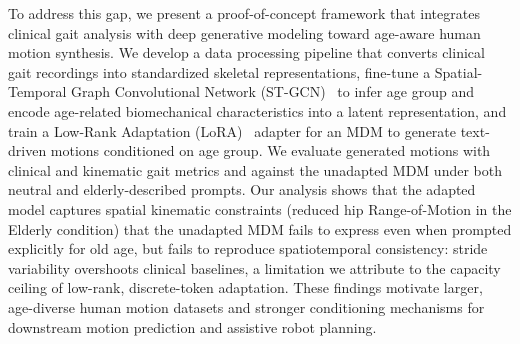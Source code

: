 To address this gap, we present a proof-of-concept framework that integrates clinical gait analysis with deep generative modeling toward age-aware human motion synthesis.
We develop a data processing pipeline that converts clinical gait recordings into standardized skeletal representations, fine-tune a Spatial-Temporal Graph Convolutional Network (ST-GCN)~\cite{yan2018stgcn} to infer age group and encode age-related biomechanical characteristics into a latent representation, and train a Low-Rank Adaptation (LoRA)~\cite{hu2022lora} adapter for an MDM to generate text-driven motions conditioned on age group.
We evaluate generated motions with clinical and kinematic gait metrics and against the unadapted MDM under both neutral and elderly-described prompts.
Our analysis shows that the adapted model captures spatial kinematic constraints (reduced hip Range-of-Motion in the Elderly condition) that the unadapted MDM fails to express even when prompted explicitly for old age, but fails to reproduce spatiotemporal consistency: stride variability overshoots clinical baselines, a limitation we attribute to the capacity ceiling of low-rank, discrete-token adaptation.
These findings motivate larger, age-diverse human motion datasets and stronger conditioning mechanisms for downstream motion prediction and assistive robot planning.